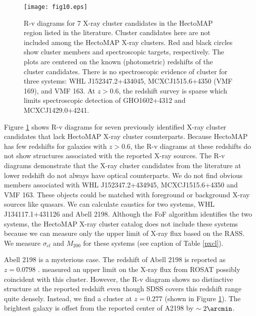 \documentclass[iop, apj]{emulateapj}
\begin{document}
\begin{figure}
\centering
\texttt{[image: fig10.eps]}
\caption{
R-v diagrams for 7 X-ray cluster candidates in the HectoMAP region
 listed in the literature.
Cluster candidates here are not included among the HectoMAP X-ray clusters.  
Red and black circles show cluster members and spectroscopic targets, respectively. 
The plots are centered on the known (photometric) redshifts of the cluster candidates. 
There is no spectroscopic evidence of cluster 
 for three systems: WHL J152347.2+434045, MCXCJ1515.6+4350 (VMF 169), and VMF 163. 
At $z > 0.6$, the redshift survey is sparse
 which limits spectroscopic detection of 
 GHO1602+4312 and MCXCJ1429.0+4241. }
\label{rvpxcl}
\end{figure}
 
Figure \ref{rvpxcl} shows R-v diagrams for seven previously identified X-ray cluster candidates
 that lack HectoMAP X-ray cluster counterparts. 
Because HectoMAP has few redshifts for galaxies with $z > 0.6$, 
 the R-v diagrams at these redshifts do not show structures associated with the reported X-ray sources. 
The R-v diagrams demonstrate that 
 the X-ray cluster candidates from the literature at lower redshift do not always have optical counterparts. 
We do not find obvious members associated with 
 WHL J152347.2+434945, MCXCJ1515.6+4350 and VMF 163. %
These objects could be matched with foreground or background X-ray sources like quasars. 
We can calculate caustics for two systems, 
 WHL J134117.1+431126 and Abell 2198. 
Although the FoF algorithm identifies the two systems, 
 the HectoMAP X-ray cluster catalog does not include these systems
 because we can measure only the upper limit of X-ray flux based on the RASS.  
We measure $\sigma_{cl}$ and $M_{200}$ for these systems (see caption of Table \ref{pxcl}). 

Abell 2198 is a mysterious case. 
The redshift of Abell 2198 is reported as $z = 0.0798$ \citep{Ciardullo83, Abell89}. 
\citet{David99} measured an upper limit on the X-ray flux from ROSAT 
 possibly coincident with this cluster. 
However, the R-v diagram shows no distinctive structure
 at the reported redshift even though SDSS covers this redshift range quite densely. 
Instead, we find a cluster at $z = 0.277$ (shown in Figure \ref{rvpxcl}). 
The brightest galaxy is offset from 
 the reported center of A2198 by $\sim2\arcmin$. 
\end{document}
